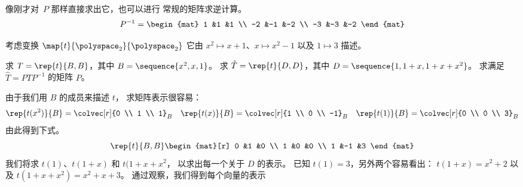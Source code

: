 \begin{exercises}
\begin{answer}
\begin{exparts}
          像刚才对~$P$ 那样直接求出它，也可以进行 
          常规的矩阵求逆计算。
          \begin{equation*}
            P^{-1}=
            \begin{mat}
               1 &1 &1 \\
               -2 &-1  &-2  \\
               -3 &-3  &-2
            \end{mat}
          \end{equation*}
      \end{exparts}
    \end{answer}
  \item 
    考虑变换 $\map{t}{\polyspace_2}{\polyspace_2}$
    它由
    $x^2\mapsto x+1$、$x\mapsto x^2-1$ 以及 $1\mapsto 3$ 描述。
    \begin{exparts}
      \partsitem 求 $T=\rep{t}{B,B}$，其中 $B=\sequence{x^2,x,1}$。 
      \partsitem 求 $\hat{T}=\rep{t}{D,D}$，其中 $D=\sequence{1,1+x,1+x+x^2}$。
      \partsitem 求满足 $\hat{T}=PTP^{-1}$ 的矩阵 $P$。 
    \end{exparts}
    \begin{answer}
      \begin{exparts}
        \partsitem 由于我们用 $B$ 的成员来描述 $t$，
          求矩阵表示很容易：
          \begin{equation*}
            \rep{t(x^2)}{B}=\colvec[r]{0 \\ 1 \\ 1}_B
            \quad
            \rep{t(x)}{B}=\colvec[r]{1 \\ 0 \\ -1}_B
            \quad
            \rep{t(1)}{B}=\colvec[r]{0 \\ 0 \\ 3}_B
          \end{equation*}
          由此得到下式。
          \begin{equation*}
            \rep{t}{B,B}
            \begin{mat}[r]
              0  &1  &0  \\
              1  &0  &0  \\
              1  &-1 &3  
            \end{mat}
          \end{equation*}
        \partsitem 我们将求 $t(1)$、$t(1+x)$ 和 $t(1+x+x^2$，
          以求出每一个关于 $D$ 的表示。
          已知 $t(1)=3$，另外两个容易看出：
          $t(1+x)=x^2+2$ 以及 $t(1+x+x^2)=x^2+x+3$。
          通过观察，我们得到每个向量的表示

\end{exparts}
\end{answer}
\end{exercises}
